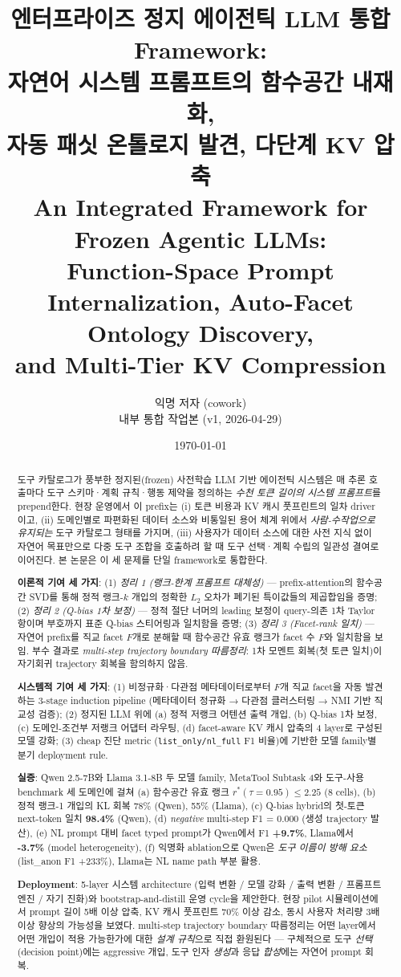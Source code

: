 \documentclass[11pt]{article}
\title{
  엔터프라이즈 정지 에이전틱 LLM 통합 Framework:\\
  자연어 시스템 프롬프트의 함수공간 내재화,\\
  자동 패싯 온톨로지 발견, 다단계 KV 압축\\[4pt]
  \large An Integrated Framework for Frozen Agentic LLMs:\\
  Function-Space Prompt Internalization, Auto-Facet Ontology Discovery,\\
  and Multi-Tier KV Compression
}
\author{
  익명 저자 (cowork)\\
  내부 통합 작업본 (v1, 2026-04-29)
}
\date{\today}
\theoremstyle{definition}
\begin{document}
\maketitle

\begin{abstract}
\noindent
도구 카탈로그가 풍부한 정지된(frozen) 사전학습 LLM 기반 에이전틱 시스템은 매 추론 호출마다 도구 스키마·계획 규칙·행동 제약을 정의하는 \emph{수천 토큰 길이의 시스템 프롬프트}를 prepend한다. 현장 운영에서 이 prefix는 (i) 토큰 비용과 KV 캐시 풋프린트의 일차 driver이고, (ii) 도메인별로 파편화된 데이터 소스와 비통일된 용어 체계 위에서 \emph{사람-수작업으로 유지되는} 도구 카탈로그 형태를 가지며, (iii) 사용자가 데이터 소스에 대한 사전 지식 없이 자연어 목표만으로 다중 도구 조합을 호출하려 할 때 도구 선택·계획 수립의 일관성 결여로 이어진다. 본 논문은 이 세 문제를 단일 framework로 통합한다.

\textbf{이론적 기여 세 가지}: (1) \emph{정리 1 (랭크-한계 프롬프트 대체성)} ---  prefix-attention의 함수공간 SVD를 통해 정적 랭크-$k$ 개입의 정확한 $L_2$ 오차가 폐기된 특이값들의 제곱합임을 증명; (2) \emph{정리 2 (Q-bias 1차 보정)} --- 정적 절단 너머의 leading 보정이 query-의존 1차 Taylor 항이며 부호까지 표준 Q-bias 스티어링과 일치함을 증명; (3) \emph{정리 3 (Facet-rank 일치)} --- 자연어 prefix를 직교 facet $F$개로 분해할 때 함수공간 유효 랭크가 facet 수 $F$와 일치함을 보임. 부수 결과로 \emph{multi-step trajectory boundary 따름정리}: 1차 모멘트 회복(첫 토큰 일치)이 자기회귀 trajectory 회복을 함의하지 않음.

\textbf{시스템적 기여 세 가지}: (1) 비정규화·다관점 메타데이터로부터 $F$개 직교 facet을 자동 발견하는 3-stage induction pipeline (메타데이터 정규화 → 다관점 클러스터링 → NMI 기반 직교성 검증); (2) 정지된 LLM 위에 (a) 정적 저랭크 어텐션 출력 개입, (b) Q-bias 1차 보정, (c) 도메인-조건부 저랭크 어댑터 라우팅, (d) facet-aware KV 캐시 압축의 4 layer로 구성된 모델 강화; (3) cheap 진단 metric (\texttt{list\_only/nl\_full} F1 비율)에 기반한 모델 family별 분기 deployment rule.

\textbf{실증}: Qwen 2.5-7B와 Llama 3.1-8B 두 모델 family, MetaTool Subtask 4와 도구-사용 benchmark 세 도메인에 걸쳐 (a) 함수공간 유효 랭크 $r^*(\tau{=}0.95) \le 2.25$ (8 cells), (b) 정적 랭크-1 개입의 KL 회복 78\% (Qwen), 55\% (Llama), (c) Q-bias hybrid의 첫-토큰 next-token 일치 \textbf{98.4\%} (Qwen), (d) \emph{negative} multi-step F1 = 0.000 (생성 trajectory 발산), (e) NL prompt 대비 facet typed prompt가 Qwen에서 F1 \textbf{+9.7\%}, Llama에서 \textbf{-3.7\%} (model heterogeneity), (f) 익명화 ablation으로 Qwen은 \emph{도구 이름이 방해 요소} (list\_anon F1 +233\%), Llama는 NL name path 부분 활용.

\textbf{Deployment}: 5-layer 시스템 architecture (입력 변환 / 모델 강화 / 출력 변환 / 프롬프트 엔진 / 자기 진화)와 bootstrap-and-distill 운영 cycle을 제안한다. 현장 pilot 시뮬레이션에서 prompt 길이 5배 이상 압축, KV 캐시 풋프린트 70\% 이상 감소, 동시 사용자 처리량 3배 이상 향상의 가능성을 보였다. multi-step trajectory boundary 따름정리는 어떤 layer에서 어떤 개입이 적용 가능한가에 대한 \emph{설계 규칙}으로 직접 환원된다 --- 구체적으로 도구 \emph{선택} (decision point)에는 aggressive 개입, 도구 인자 \emph{생성}과 응답 \emph{합성}에는 자연어 prompt 회복.
\end{abstract}
\end{document}
